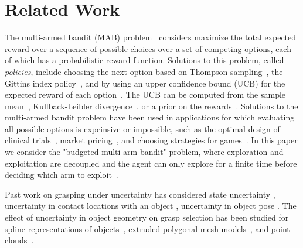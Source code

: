 \documentclass[letterpaper, 10 pt, conference]{ieeeconf}  %
\begin{document}
\section{Related Work}

The multi-armed bandit (MAB) problem~\cite{barto1998reinforcement, lai1985asymptotically, robbins1952some} considers maximize the total expected reward over a sequence of possible choices over a set of competing options, each of which has a probabilistic reward function.
Solutions to this problem, called {\it policies}, include choosing the next option based on Thompson sampling~\cite{agrawal2011analysis}, the Gittins index policy~\cite{weber1992gittins}, and by using an upper confidence bound (UCB) for the expected reward of each option~\cite{auer2002finite}.
The UCB can be computed from the sample mean~\cite{agrawal1995sample}, Kullback-Leibler divergence~\cite{cappe2013kullback}, or a prior on the rewards~\cite{kaufmann2012bayesian}.
Solutions to the multi-armed bandit problem have been used in applications for which evaluating all possible options is expeinsive or impossible, such as the optimal design of clinical trials~\cite{simon1989optimal}, market pricing~\cite{rothschild1974two}, and choosing strategies for games~\cite{st2012online}.
In this paper we consider the "budgeted multi-arm bandit" problem, where exploration and exploitation are decoupled and the agent can only explore for a finite time before deciding which arm to exploit~\cite{madani2004budgeted}.

Past work on grasping under uncertainty has considered state uncertainty \cite{goldberg1990bayesian, stulp2011learning}, uncertainty in contact locations with an object \cite{zheng2005}, uncertainty in object pose \cite{christopoulos2007handling, weisz2012pose, kim2012physically}.
The effect of uncertainty in object geometry on grasp selection has been studied for spline representations of objects~\cite{christopoulos2007handling}, extruded polygonal mesh models~\cite{kehoe2012estimating, kehoe2012toward}, and point clouds~\cite{hsiao2011bayesian}.
\end{document}
